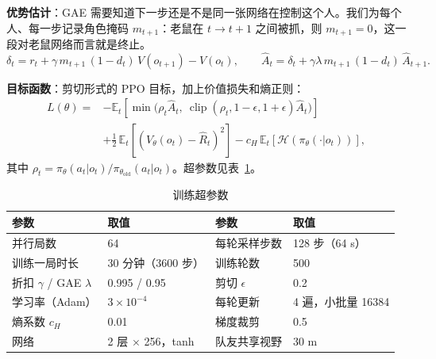 \documentclass[a4paper,zihao=5,fontset=fandol,UTF8]{ctexart}
\begin{document}
\textbf{优势估计}：GAE 需要知道下一步还是不是同一张网络在控制这个人。我们为每个人、每一步记录角色掩码 $m_{t+1}$：老鼠在 $t\to t+1$ 之间被抓，则 $m_{t+1}=0$，这一段对老鼠网络而言就是终止。
\begin{equation}
\delta_t = r_t + \gamma\, m_{t+1}\,(1-d_t)\, V(o_{t+1}) - V(o_t),\qquad
\hat A_t = \delta_t + \gamma\lambda\, m_{t+1}\,(1-d_t)\,\hat A_{t+1}.
\end{equation}

\textbf{目标函数}：剪切形式的 PPO 目标，加上价值损失和熵正则：
\begin{equation}
\begin{aligned}
L(\theta)={}&-\mathbb{E}_t\!\left[\min\!\big(\rho_t\hat A_t,\ \operatorname{clip}(\rho_t,1-\epsilon,1+\epsilon)\hat A_t\big)\right]\\
&+\tfrac12\,\mathbb{E}_t\!\left[(V_\theta(o_t)-\hat R_t)^2\right]-c_H\,\mathbb{E}_t\!\left[\mathcal H(\pi_\theta(\cdot|o_t))\right],
\end{aligned}
\end{equation}
其中 $\rho_t=\pi_\theta(a_t|o_t)/\pi_{\theta_{\text{old}}}(a_t|o_t)$。超参数见表~\ref{tab:hp}。

\begin{table}[t]
  \centering\small
  \caption{训练超参数}
  \label{tab:hp}
  \begin{tabular}{@{}ll@{\qquad}ll@{}}
    \toprule
    参数 & 取值 & 参数 & 取值\\
    \midrule
    并行局数 & 64 & 每轮采样步数 & 128 步（64 s）\\
    训练一局时长 & 30 分钟（3600 步） & 训练轮数 & 500\\
    折扣 $\gamma$ / GAE $\lambda$ & 0.995 / 0.95 & 剪切 $\epsilon$ & 0.2\\
    学习率（Adam） & $3\times10^{-4}$ & 每轮更新 & 4 遍，小批量 16384\\
    熵系数 $c_H$ & 0.01 & 梯度裁剪 & 0.5\\
    网络 & 2 层 × 256，tanh & 队友共享视野 & 30 m\\
    \bottomrule
  \end{tabular}
\end{table}
\end{document}
